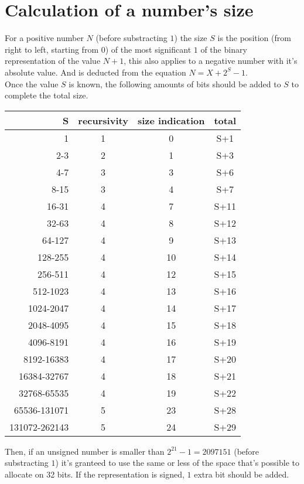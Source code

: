 \documentclass[a4paper,11pt]{article}
\begin{document}
\section{Calculation of a number's size}
For a positive number $N$ (before substracting $1$) the size $S$ is the position (from right to left, starting from $0$) of the most significant $1$ of the binary representation of the value $N+1$, this also applies to a negative number with it's absolute value. And is deducted from the equation $N = X+2^{S}-1$.
\\ Once the value $S$ is known, the following amounts of bits should be added to $S$ to complete the total size.
\begin{center}
	\begin{tabular}{ r || c| c || c}
		S & recursivity & size indication & total \\
		\hline 
		1 & 1 & 0 & S+1 \\
		2-3 & 2 & 1 & S+3 \\
		4-7 & 3 & 3 & S+6 \\
		8-15 & 3 & 4 & S+7 \\
		16-31 & 4 & 7 & S+11 \\
		32-63 & 4 & 8 & S+12 \\
		64-127 & 4 & 9 & S+13 \\
		128-255 & 4 & 10 & S+14 \\
		256-511 & 4 & 12 & S+15 \\
		512-1023 & 4 & 13 & S+16 \\
		1024-2047 & 4 & 14 & S+17 \\
		2048-4095 & 4 & 15 & S+18 \\
		4096-8191 & 4 & 16 & S+19 \\
		8192-16383 & 4 & 17 & S+20 \\
		16384-32767 & 4 & 18 & S+21 \\
		32768-65535 & 4 & 19 & S+22 \\	  
		65536-131071 & 5 & 23 & S+28 \\
		131072-262143 & 5 & 24 & S+29
	\end{tabular}
\end{center} 
Then, if an unsigned number is smaller than $2^{21}-1=2097151$ (before substracting $1$) it's granteed to use the same or less of the space that's possible to allocate on 32 bits.
	If the representation is signed, $1$ extra bit should be added.
\end{document}
